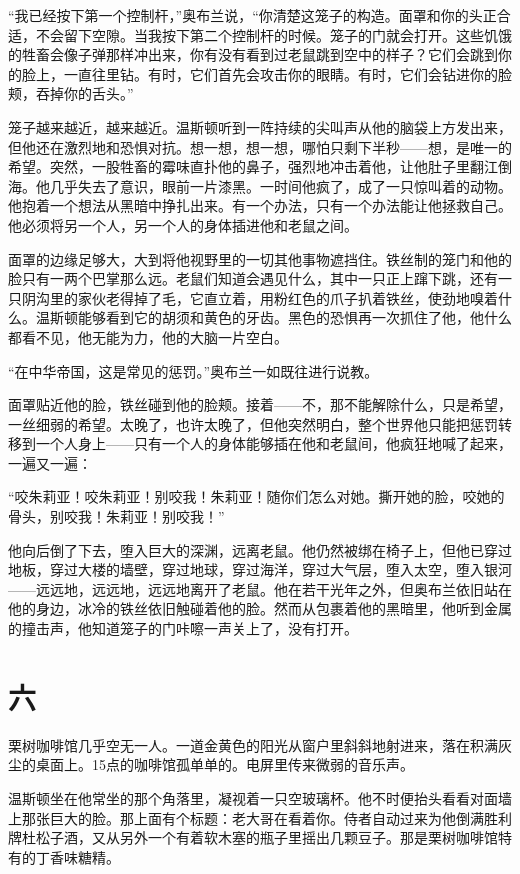 ``我已经按下第一个控制杆，''奥布兰说，``你清楚这笼子的构造。面罩和你的头正合适，不会留下空隙。当我按下第二个控制杆的时候。笼子的门就会打开。这些饥饿的牲畜会像子弹那样冲出来，你有没有看到过老鼠跳到空中的样子？它们会跳到你的脸上，一直往里钻。有时，它们首先会攻击你的眼睛。有时，它们会钻进你的脸颊，吞掉你的舌头。''

笼子越来越近，越来越近。温斯顿听到一阵持续的尖叫声从他的脑袋上方发出来，但他还在激烈地和恐惧对抗。想一想，想一想，哪怕只剩下半秒——想，是唯一的希望。突然，一股牲畜的霉味直扑他的鼻子，强烈地冲击着他，让他肚子里翻江倒海。他几乎失去了意识，眼前一片漆黑。一时间他疯了，成了一只惊叫着的动物。他抱着一个想法从黑暗中挣扎出来。有一个办法，只有一个办法能让他拯救自己。他必须将另一个人，另一个人的身体插进他和老鼠之间。

面罩的边缘足够大，大到将他视野里的一切其他事物遮挡住。铁丝制的笼门和他的脸只有一两个巴掌那么远。老鼠们知道会遇见什么，其中一只正上蹿下跳，还有一只阴沟里的家伙老得掉了毛，它直立着，用粉红色的爪子扒着铁丝，使劲地嗅着什么。温斯顿能够看到它的胡须和黄色的牙齿。黑色的恐惧再一次抓住了他，他什么都看不见，他无能为力，他的大脑一片空白。

``在中华帝国，这是常见的惩罚。''奥布兰一如既往进行说教。

面罩贴近他的脸，铁丝碰到他的脸颊。接着——不，那不能解除什么，只是希望，一丝细弱的希望。太晚了，也许太晚了，但他突然明白，整个世界他只能把惩罚转移到一个人身上——只有一个人的身体能够插在他和老鼠间，他疯狂地喊了起来，一遍又一遍：

``咬朱莉亚！咬朱莉亚！别咬我！朱莉亚！随你们怎么对她。撕开她的脸，咬她的骨头，别咬我！朱莉亚！别咬我！''

他向后倒了下去，堕入巨大的深渊，远离老鼠。他仍然被绑在椅子上，但他已穿过地板，穿过大楼的墙壁，穿过地球，穿过海洋，穿过大气层，堕入太空，堕入银河——远远地，远远地，远远地离开了老鼠。他在若干光年之外，但奥布兰依旧站在他的身边，冰冷的铁丝依旧触碰着他的脸。然而从包裹着他的黑暗里，他听到金属的撞击声，他知道笼子的门咔嚓一声关上了，没有打开。

\section*{六}\label{ux4e8cux5341ux56db}

栗树咖啡馆几乎空无一人。一道金黄色的阳光从窗户里斜斜地射进来，落在积满灰尘的桌面上。15点的咖啡馆孤单单的。电屏里传来微弱的音乐声。

温斯顿坐在他常坐的那个角落里，凝视着一只空玻璃杯。他不时便抬头看看对面墙上那张巨大的脸。那上面有个标题：老大哥在看着你。侍者自动过来为他倒满胜利牌杜松子酒，又从另外一个有着软木塞的瓶子里摇出几颗豆子。那是栗树咖啡馆特有的丁香味糖精。

